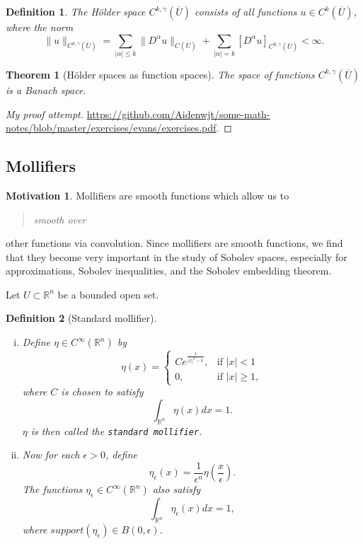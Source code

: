 \documentclass[11pt]{article}
\newtheorem{theorem}{Theorem}
\newtheorem{definition}{Definition}
\theoremstyle{definition}
\newtheorem*{motivation}{Motivation}
\begin{document}
\begin{definition}
The H\"{o}lder space $C^{k,\gamma}(\overline{U})$ consists of all functions $u \in C^k(\overline{U})$,
where the norm
\[\|u\|_{C^{k,\gamma}(\overline{U})} = \sum_{|\alpha| \leq k}\|D^{\alpha}u\|_{C(\overline{U})} + \sum_{|\alpha| = k}[D^{\alpha}u]_{C^{0,\gamma}(\overline{U})} < \infty.\]
\end{definition}

\begin{theorem}[H\"{o}lder spaces as function spaces]
The space of functions $C^{k,\gamma}(\overline{U})$ is a Banach space.
\end{theorem}
\begin{proof}[My proof attempt]
\url{https://github.com/Aidenwjt/some-math-notes/blob/master/exercises/evans/exercises.pdf}.
\end{proof}

\newpage

\subsection{Mollifiers}
\begin{motivation}
	Mollifiers are smooth functions which allow us to \blockquote{\textit{smooth over}} other functions via convolution.
	Since mollifiers are smooth functions, we find that they become very important in the study of Sobolev spaces,
	especially for approximations, Sobolev inequalities, and the Sobolev embedding theorem.
\end{motivation}
Let $U \subset \mathbb{R}^n$ be a bounded open set.
\begin{definition}[Standard mollifier]~ 
	\begin{enumerate}[(i)]
		\item Define $\eta \in C^{\infty}(\mathbb{R}^n)$ by
			\begin{equation*}
				\eta(x) =
				\begin{cases}
					C e^{\frac{1}{|x|^2 - 1}},& \text{if } |x| < 1 \\
					0,& \text{if } |x| \geq 1,
				\end{cases}
			\end{equation*}
			where $C$ is chosen to satisfy
			\begin{equation*}
				\int_{\mathbb{R}^n}{\eta(x)dx} = 1.
			\end{equation*}
			$\eta$ is then called the \texttt{standard mollifier}.
		\item Now for each $\epsilon > 0$, define
			\begin{equation*}
				\eta_{\epsilon}(x) = \frac{1}{\epsilon^n}\eta\left(\frac{x}{\epsilon}\right).
			\end{equation*}
			The functions $\eta_{\epsilon} \in C^{\infty}(\mathbb{R}^n)$ also satisfy
			\begin{equation*}
				\int_{\mathbb{R}^n}{\eta_{\epsilon}(x)dx} = 1,
			\end{equation*}
			where $support(\eta_{\epsilon}) \in B(0,\epsilon)$.
	\end{enumerate}
\end{definition}
\end{document}
